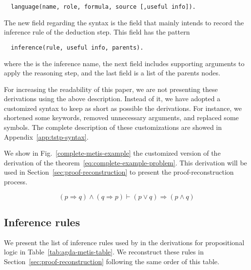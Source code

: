 \documentclass[../paper.tex]{subfiles}
\begin{document}
\begin{verbatim}
  language(name, role, formula, source [,useful info]).
\end{verbatim}

The new field regarding the \TPTP syntax is the  field
that mainly intends to record the inference rule of the deduction step.
This field has the pattern

\begin{verbatim}
  inference(rule, useful info, parents).
\end{verbatim}

where the  is the inference name, the next field
includes supporting arguments to apply the reasoning step, and the
last field is a list of the parents nodes.

For increasing the readability of this paper, we are not presenting these \TSTP
derivations using the above description. Instead of it, we have adopted a
customized \TSTP syntax to keep as short as possible the \Metis derivations. For
instance,  we shortened some keywords, removed unnecessary arguments, and
replaced some symbols. The complete description of these customizations are
showed in Appendix~\ref{app:tstp-syntax}.

\begin{myexamplenum}
\label{fig:metis-example-tree}
We show in Fig.~\ref{complete-metis-example} the customized version
of the \Metis derivation of the theorem~\eqref{eq:complete-example-problem}.
This derivation will be used in Section~\ref{sec:proof-reconstruction} to
present the proof-reconstruction process.

\begin{equation}
\label{eq:complete-example-problem}
(p \Rightarrow q) \wedge (q \Rightarrow p) ⊢ (p \vee q) \Rightarrow (p \wedge q)
\end{equation}



\end{myexamplenum}



\subsection{Inference rules}
\label{ssec:metis-inferences-rules}

We present the list of inference rules used by \Metis in the \TSTP derivations
for propositional logic in Table~\ref{tab:agda-metis-table}. We reconstruct
these rules in Section~\ref{sec:proof-reconstruction} following the same order
of this table.
\end{document}
